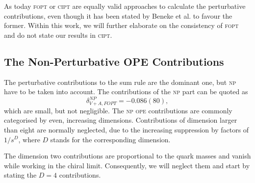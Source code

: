 \documentclass[../../index.tex]{subfiles}
\begin{document}
As today \textsc{fopt} or \textsc{cipt} are equally valid approaches to
calculate the perturbative contributions, even though it has been stated by
Beneke et al. \cite{Beneke2008} to favour the former. Within this work, we will
further elaborate on the consistency of \textsc{fopt} and do not state our
results in \textsc{cipt}.

\subsection{The Non-Perturbative OPE Contributions}
The perturbative contributions to the sum rule are the dominant one, but
\textsc{np} have to be taken into account. The contributions of the \textsc{np}
part can be quoted as \cite{Jamin2013}
\begin{equation}
  \delta_{V+A,FOPT}^{NP} = -0.086(80),
\end{equation}
which are small, but not negligible. The \textsc{np} \textsc{ope} contributions
are commonly categorised by even, increasing dimensions. Contributions of
dimension larger than eight are normally neglected, due to the increasing
suppression by factors of \(1/s^{D}\), where \(D\) stands for the
corresponding dimension.

The dimension two contributions are proportional to the quark masses and vanish
while working in the chiral limit. Consequently, we will neglect them and start
by stating the \(D=4\) contributions.
\end{document}
